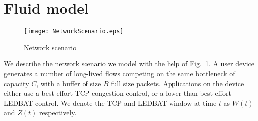 \documentclass[conference]{IEEEtran}
\newcommand{\secL}[1]{\label{sec:#1}}
\newcommand{\figR}[1]{Fig.~\ref{fig:#1}}
\newcommand{\figLC}[2]{
		\caption{#2}
		\label{fig:#1}
}
\begin{document}
\section{Fluid model}\secL{model}

\begin{figure}[t]
    \begin{center}
        \texttt{[image: NetworkScenario.eps]}
        \figLC{scenario}{Network scenario}
    \end{center}
\end{figure}





We describe the network scenario we model with the help of \figR{scenario}. 
A user device generates a number of long-lived flows competing on the same bottleneck of capacity $C$, with a buffer of size $B$ full size packets. Applications on the device either use a best-effort TCP congestion control, or a lower-than-best-effort LEDBAT control. We denote the TCP and LEDBAT window at time $t$ as $W(t)$ and $Z(t)$ respectively.  
\end{document}
